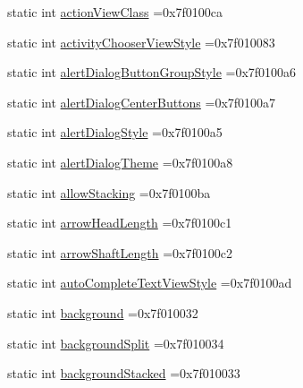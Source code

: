 \begin{DoxyCompactItemize}
static int \hyperlink{classandroid_1_1support_1_1graphics_1_1drawable_1_1animated_1_1R_1_1attr_a03ab1cd26806e67ffa654d4c61f82ba3}{action\+View\+Class} =0x7f0100ca
\item 
static int \hyperlink{classandroid_1_1support_1_1graphics_1_1drawable_1_1animated_1_1R_1_1attr_a64d092e6db1dbc0c3f57b8223412be96}{activity\+Chooser\+View\+Style} =0x7f010083
\item 
static int \hyperlink{classandroid_1_1support_1_1graphics_1_1drawable_1_1animated_1_1R_1_1attr_a12dd56bf73cf57802d89523875001af5}{alert\+Dialog\+Button\+Group\+Style} =0x7f0100a6
\item 
static int \hyperlink{classandroid_1_1support_1_1graphics_1_1drawable_1_1animated_1_1R_1_1attr_aa693060a1e30b20ee838da5e834a7225}{alert\+Dialog\+Center\+Buttons} =0x7f0100a7
\item 
static int \hyperlink{classandroid_1_1support_1_1graphics_1_1drawable_1_1animated_1_1R_1_1attr_a61a87c46a083accae6f01e050d6b23d1}{alert\+Dialog\+Style} =0x7f0100a5
\item 
static int \hyperlink{classandroid_1_1support_1_1graphics_1_1drawable_1_1animated_1_1R_1_1attr_afd729d23867ebc3dfd8f7d29dd3bda8c}{alert\+Dialog\+Theme} =0x7f0100a8
\item 
static int \hyperlink{classandroid_1_1support_1_1graphics_1_1drawable_1_1animated_1_1R_1_1attr_a8c10c152405fbe21bc98f7ee48a7b873}{allow\+Stacking} =0x7f0100ba
\item 
static int \hyperlink{classandroid_1_1support_1_1graphics_1_1drawable_1_1animated_1_1R_1_1attr_a0c4016a75f4c32648d1506816605ef88}{arrow\+Head\+Length} =0x7f0100c1
\item 
static int \hyperlink{classandroid_1_1support_1_1graphics_1_1drawable_1_1animated_1_1R_1_1attr_aedbccbc4f877b1f5c43b9e63c0863fdd}{arrow\+Shaft\+Length} =0x7f0100c2
\item 
static int \hyperlink{classandroid_1_1support_1_1graphics_1_1drawable_1_1animated_1_1R_1_1attr_a48243332e0c9853fda9dd7bb0156918d}{auto\+Complete\+Text\+View\+Style} =0x7f0100ad
\item 
static int \hyperlink{classandroid_1_1support_1_1graphics_1_1drawable_1_1animated_1_1R_1_1attr_aa687cb35795fc4b34f22c9273267b25b}{background} =0x7f010032
\item 
static int \hyperlink{classandroid_1_1support_1_1graphics_1_1drawable_1_1animated_1_1R_1_1attr_a784c5646f1e48c04c03f8dcff36e01d7}{background\+Split} =0x7f010034
\item 
static int \hyperlink{classandroid_1_1support_1_1graphics_1_1drawable_1_1animated_1_1R_1_1attr_a959e51e3c815d76970b6bd64c8009366}{background\+Stacked} =0x7f010033

\end{DoxyCompactItemize}
